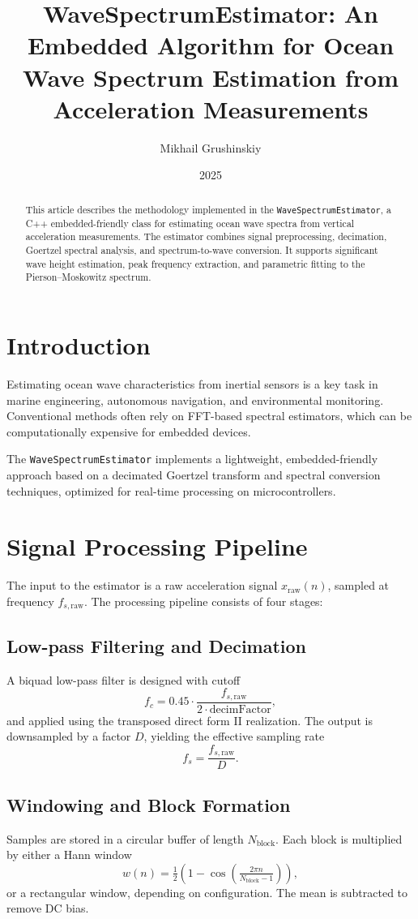\documentclass[11pt]{article}
\title{WaveSpectrumEstimator: An Embedded Algorithm for Ocean Wave Spectrum Estimation from Acceleration Measurements}
\author{Mikhail Grushinskiy}
\date{2025}
\begin{document}
\maketitle

\begin{abstract}
This article describes the methodology implemented in the \texttt{WaveSpectrumEstimator}, 
a C++ embedded-friendly class for estimating ocean wave spectra from vertical acceleration measurements.
The estimator combines signal preprocessing, decimation, Goertzel spectral analysis, and spectrum-to-wave conversion. 
It supports significant wave height estimation, peak frequency extraction, and parametric fitting to the Pierson--Moskowitz spectrum.
\end{abstract}

\section{Introduction}
Estimating ocean wave characteristics from inertial sensors is a key task in marine engineering, autonomous navigation, 
and environmental monitoring. Conventional methods often rely on FFT-based spectral estimators, which can be computationally expensive for embedded devices. 

The \texttt{WaveSpectrumEstimator} implements a lightweight, embedded-friendly approach based on a decimated Goertzel transform and spectral conversion techniques, optimized for real-time processing on microcontrollers.

\section{Signal Processing Pipeline}
The input to the estimator is a raw acceleration signal $x_{\text{raw}}(n)$, sampled at frequency $f_{s,\text{raw}}$. The processing pipeline consists of four stages:

\subsection{Low-pass Filtering and Decimation}
A biquad low-pass filter is designed with cutoff
\[
f_c = 0.45 \cdot \frac{f_{s,\text{raw}}}{2 \cdot \text{decimFactor}},
\]
and applied using the transposed direct form II realization. The output is downsampled by a factor $D$, yielding the effective sampling rate
\[
f_s = \frac{f_{s,\text{raw}}}{D}.
\]

\subsection{Windowing and Block Formation}
Samples are stored in a circular buffer of length $N_\text{block}$. Each block is multiplied by either a Hann window
\[
w(n) = \tfrac{1}{2}\left(1 - \cos\left(\tfrac{2\pi n}{N_\text{block}-1}\right)\right),
\]
or a rectangular window, depending on configuration. The mean is subtracted to remove DC bias.
\end{document}
